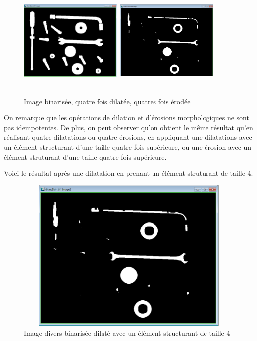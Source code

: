 \documentclass{scrreprt}
\begin{document}
\begin{figure}[!h]
\centering
\includegraphics[height=5cm,width=5cm]{images/4dilates.png} \hfill
\includegraphics[height=5cm,width=5cm]{images/4erodes.png}
\caption{Image binarisée, quatre fois dilatée, quatres fois érodée}
\end{figure}

On remarque que les opérations de dilation et d'érosions morphologiques ne sont pas idempotentes.
De plus, on peut observer qu'on obtient le même résultat qu'en réalisant quatre dilatations ou quatre érosions, 
en appliquant une dilatations avec un élément structurant d'une taille quatre fois supérieure, ou une érosion avec
un élément struturant d'une taille quatre fois supérieure.

Voici le résultat après une dilatation en prenant un élément struturant de taille 4. 

\begin{figure}[!h]
\centering
\includegraphics[height=7.5cm,width=15cm]{images/graydilatation.png}
\caption{Image divers binarisée dilaté avec un élément structurant de taille 4}
\end{figure}  
\end{document}
